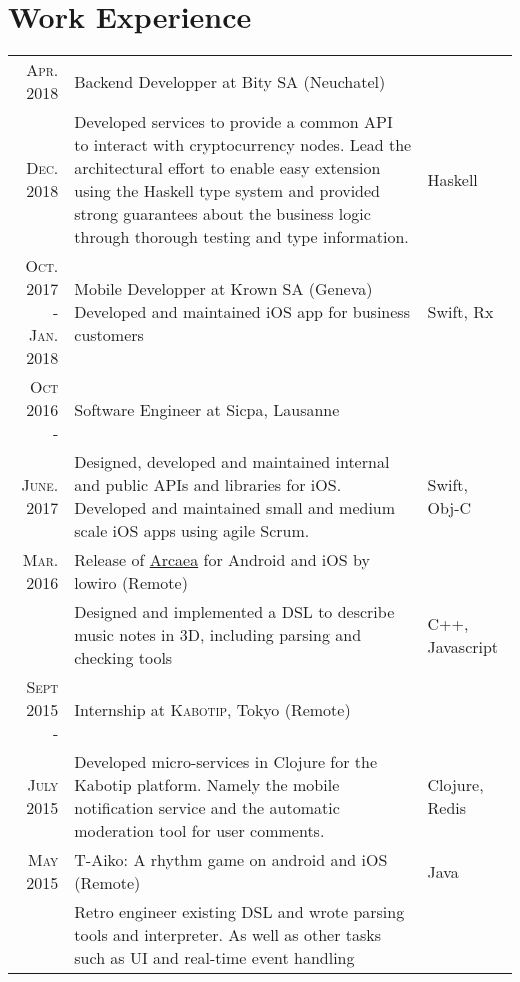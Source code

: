 \documentclass[a4paper,10pt]{article} %
\begin{document}
\section{Work Experience}
\renewcommand{\arraystretch}{1.3}
\begin{tabular}{r|p{9.3cm}|l}
\textsc{Apr. 2018} & Backend Developper at Bity SA (Neuchatel) & \\
\textsc{Dec. 2018} & \footnotesize{Developed services to provide a common API to interact with cryptocurrency nodes. Lead the architectural effort to enable easy extension using the Haskell type system and provided strong guarantees about the business logic through thorough testing and type information.} & Haskell\\

\makecell[cr]{
	\textsc{Oct. 2017 -} \\
	\textsc{Jan. 2018}
	} & \makecell[cl]{Mobile Developper at Krown SA (Geneva)\\
	    \footnotesize{Developed and maintained iOS app for business customers}}& Swift, Rx\\

\textsc{Oct 2016 -} & Software Engineer at Sicpa, Lausanne\\

\textsc{June. 2017}  
& \footnotesize{Designed, developed and maintained internal and public APIs and libraries for iOS. Developed and maintained small and medium scale iOS apps using agile Scrum.} 
& Swift, Obj-C\\

\textsc{Mar. 2016}  & Release of \href{https://arcaea.lowiro.com}{Arcaea} for Android and iOS by lowiro (Remote)& \\
&  \footnotesize{Designed and implemented a DSL to describe music notes in 3D, including parsing and checking tools}& C++, Javascript\\


\textsc{Sept 2015 -}& Internship at \textsc{Kabotip}, Tokyo (Remote) \emph{}\\
\textsc{July 2015} & \footnotesize{Developed micro-services in Clojure for the Kabotip platform. Namely the mobile notification service and the automatic moderation tool for user comments.} & Clojure, Redis\\
\textsc{May} 2015 & T-Aiko: A rhythm game on android and iOS (Remote) & Java\\
& \footnotesize{Retro engineer existing DSL and wrote parsing tools and interpreter. As well as other tasks such as UI and real-time event handling} & \\

\end{tabular}
\end{document}
